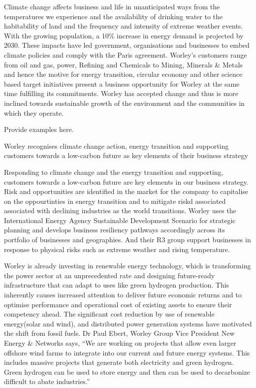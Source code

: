 \documentclass[11pt,a4paper,]{article}
\begin{document}
Climate change affects business and life in unanticipated ways from the temperatures we experience and the availability of drinking water to the habitability of land and the frequency and intensity of extreme weather events. With the growing population, a 10\% increase in energy demand is projected by 2030. These impacts have led government, organisations and businesses to embed climate policies and comply with the Paris agreement. Worley's customers range from oil and gas, power, Refining and Chemicals to Mining, Minerals \& Metals and hence the motive for energy transition, circular economy and other science based target initiatives present a business opportunity for Worley at the same time fulfilling its commitments. Worley has accepted change and thus is more inclined towards sustainable growth of the environment and the communities in which they operate.

Provide examples here.

Worley recognises climate change action, energy transition and supporting customers towards a low-carbon future as key elements of their business strategy

Responding to climate change and the energy transition and supporting, customers towards a low-carbon future are key elements in our business strategy. Risk and opportunities are identified in the market for the company to capitalise on the oppourtinties in energy transition and to mitigate riskd associated associated with declining industries as the world transitions. Worley uses the International Energy Agency Sustainable Development Scenario for strategic planning and develops business resiliency pathways accordingly across its portfolio of businesses and geographies. And their R3 group support businesses in response to physical risks such as extreme weather and rising temperature.

Worley is already investing in renewable energy technology, which is transforming the power sector at an unprecedented rate and designing future-ready infrastructure that can adapt to uses like green hydrogen production. This inherently causes increased attention to deliver future economic returns and to optimise performance and operational cost of existing assets to ensure their competency ahead. The significant cost reduction by use of renewable energy(solar and wind), and distributed power generation systems have motivated the shift from fossil fuels. Dr Paul Ebert, Worley Group Vice President New Energy \& Networks says, ``We are working on projects that allow even larger offshore wind farms to integrate into our current and future energy systems. This includes massive projects that generate both electricity and green hydrogen. Green hydrogen can be used to store energy and then can be used to decarbonize difficult to abate industries.''
\end{document}
